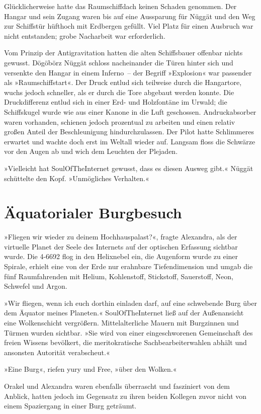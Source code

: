 Glücklicherweise hatte das Raumschiffdach keinen Schaden genommen. Der Hangar und sein Zugang waren bis auf eine Aussparung für Nüggät und den Weg zur Schiffstür hüfthoch mit Erdbergen gefüllt. Viel Platz für einen Ausbruch war nicht entstanden; grobe Nacharbeit war erforderlich.

Vom Prinzip der Antigravitation hatten die alten Schiffsbauer offenbar nichts gewusst. Dögöbörz Nüggät schloss nacheinander die Türen hinter sich und versenkte den Hangar in einem Inferno~– der Begriff »Explosion« war passender als »Raumschiffstart«. Der Druck entlud sich teilweise durch die Hangartore, wuchs jedoch schneller, als er durch die Tore abgebaut werden konnte. Die Druckdifferenz entlud sich in einer Erd- und Holzfontäne im Urwald; die Schiffskugel wurde wie aus einer Kanone in die Luft geschossen. Andruckabsorber waren vorhanden, schienen jedoch prozentual zu arbeiten und einen relativ großen Anteil der Beschleunigung hindurchzulassen. Der Pilot hatte Schlimmeres erwartet und wachte doch erst im Weltall wieder auf. Langsam floss die Schwärze vor den Augen ab und wich dem Leuchten der Plejaden.

»Vielleicht hat SoulOfTheInternet gewusst, dass es diesen Ausweg gibt.« Nüggät schüttelte den Kopf. »Unmögliches Verhalten.«


\chapter{Äquatorialer Burgbesuch}

»Fliegen wir wieder zu deinem Hochhauspalast?«, fragte Alexandra, als der virtuelle Planet der Seele des Internets auf der optischen Erfassung sichtbar wurde. Die 4-6692 flog in den Helixnebel ein, die Augenform wurde zu einer Spirale, erhielt eine von der Erde nur erahnbare Tiefendimension und umgab die fünf Raumfahrenden mit Helium, Kohlenstoff, Stickstoff, Sauerstoff, Neon, Schwefel und Argon.

»Wir fliegen, wenn ich euch dorthin einladen darf, auf eine schwebende Burg über dem Äquator meines Planeten.« SoulOfTheInternet ließ auf der Außenansicht eine Wolkenschicht vergrößern. Mittelalterliche Mauern mit Burgzinnen und Türmen wurden sichtbar. »Sie wird von einer eingeschworenen Gemeinschaft des freien Wissens bevölkert, die meritokratische Sachbearbeiterwahlen abhält und ansonsten Autorität verabscheut.«

»Eine Burg«, riefen yury und Free, »über den Wolken.«

Orakel und Alexandra waren ebenfalls überrascht und fasziniert von dem Anblick, hatten jedoch im Gegensatz zu ihren beiden Kollegen zuvor nicht von einem Spaziergang in einer Burg geträumt.

